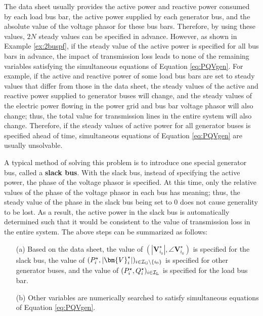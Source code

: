 \documentclass[tombow,dvipdfmx]{corona-a5-1.1}
\begin{document}
The data sheet usually provides the active power and reactive power consumed by each load bus bar, the active power supplied by each generator bus, and the absolute value of the voltage phasor for these bus bars.
Therefore, by using these values, $2N$ steady values can be specified in advance. However, as shown in Example \ref{ex:2buspf}, if the steady value of the active power is specified for all bus bars in advance, the impact of transmission loss leads to none of the remaining variables satisfying the simultaneous equations of Equation \ref{eq:PQVgen}.
For example, if the active and reactive power of some load bus bars are set to steady values that differ from those in the data sheet, the steady values of the active and reactive power supplied to generator buses will change, and the steady values of the electric power flowing in the power grid and bus bar voltage phasor will also change; thus, the total value for transmission lines in the entire system will also change.
Therefore, if the steady values of active power for all generator buses is specified ahead of time, simultaneous equations of Equation \ref{eq:PQVgen} are usually unsolvable.

A typical method of solving this problem is to introduce one special generator bus, called a \textbf{slack bus}.
With the slack bus, instead of specifying the active power, the phase of the voltage phasor is specified.
At this time, only the relative values of the phase of the voltage phasor in each bus has meaning; thus, the steady value of the phase in the slack bus being set to 0 does not cause generality to be lost.
As a result, the active power in the slack bus is automatically determined such that it would be consistent to the value of transmission loss in the entire system.
The above steps can be summarized as follows:

\medskip
\begin{breakbox}
\begin{itemize}
\item[(a)] Based on the data sheet, the value of $(|\bm{V}_{i_0}^{\star}|,\angle \bm{V}_{i_0}^{\star})$ is specified for the slack bus, the value of $(P_i^{\star},|\bm{V}_{i}^{\star}|)_{i \in \mathcal{I}_{\rm G}\setminus\{i_0\} }$ is specified for other generator buses, and the value of $(P_i^{\star},Q_i^{\star})_{i \in \mathcal{I}_{\rm L}}$ is specified for the load bus bar.
\item[(b)] Other variables are numerically searched to satisfy simultaneous equations of Equation \ref{eq:PQVgen}.
\end{itemize}
\end{breakbox}
\medskip
\end{document}
